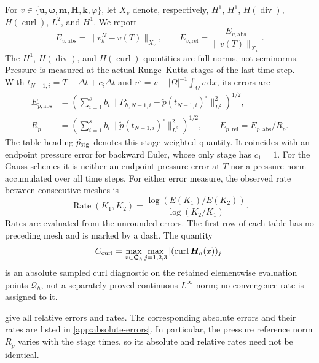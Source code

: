 \documentclass[11pt,a4paper]{article}
\newcommand{\bs}{\boldsymbol}
\newcommand{\dd}{\,\mathrm d}
\newcommand{\dt}{\Delta t}
\DeclareMathOperator{\curl}{curl}
\DeclareMathOperator{\ddiv}{div}
\newcommand{\Div}{\ddiv}
\newcommand{\pp}{\widetilde p}
\theoremstyle{definition}
\numberwithin{equation}{section}
\begin{document}
For $v\in\{\bs u,\bs\omega,\bs m,\bs H,\bs k,\varphi\}$, let
$X_v$ denote, respectively, $H^1$, $H^1$, $H(\Div)$, $H(\curl)$,
$L^2$, and $H^1$. We report
\[
 E_{v,\mathrm{abs}}=\|v_h^N-v(T)\|_{X_v},\qquad
 E_{v,\mathrm{rel}}=
 \frac{E_{v,\mathrm{abs}}}{\|v(T)\|_{X_v}}.
\]
The $H^1$, $H(\Div)$, and $H(\curl)$ quantities are full norms, not
seminorms. Pressure is measured at the actual Runge--Kutta stages of the
last time step. With $t_{N-1,i}=T-\dt+c_i\dt$ and
\mbox{$v^\circ=v-|\Omega|^{-1}\int_\Omega v\dd x$}, its errors are
\begin{align*}
 E_{\pp,\mathrm{abs}}
 &=\left(\sum_{i=1}^s b_i
  \|P_{h,N-1,i}^{\circ}-\pp(t_{N-1,i})^{\circ}\|_{L^2}^2\right)^{1/2},\\
 R_{\pp}
 &=\left(\sum_{i=1}^s b_i
  \|\pp(t_{N-1,i})^{\circ}\|_{L^2}^2\right)^{1/2},\qquad
 E_{\pp,\mathrm{rel}}=E_{\pp,\mathrm{abs}}/R_{\pp}.
\end{align*}
The table heading $\pp_{\rm stg}$ denotes this stage-weighted quantity.
It coincides with an endpoint pressure error for backward Euler, whose
only stage has $c_1=1$. For the Gauss schemes it is neither an endpoint
pressure error at $T$ nor a pressure norm accumulated over all time steps.
For either error measure, the observed rate between consecutive meshes
is
\[
 \operatorname{Rate}(K_1,K_2)=
 \frac{\log(E(K_1)/E(K_2))}{\log(K_2/K_1)}.
\]
Rates are evaluated from the unrounded errors. The first row of each
table has no preceding mesh and is marked by a dash. The quantity
\[
 C_{\rm curl}=\max_{x\in\mathcal Q_h}\max_{j=1,2,3}
                   |(\curl\bs H_h(x))_j|
\]
is an absolute sampled curl diagnostic on the retained elementwise
evaluation points $\mathcal Q_h$, not a separately proved continuous
$L^\infty$ norm; no convergence rate is assigned to it.

 give all relative errors
and rates. The corresponding absolute errors and their rates are listed
in \cref{app:absolute-errors}. In particular, the pressure reference norm
$R_{\pp}$ varies with the stage times, so its absolute and relative
rates need not be identical.
\end{document}
